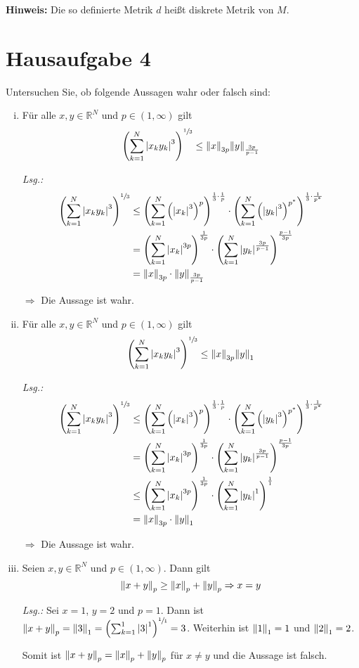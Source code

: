 \documentclass{article}
\begin{document}
\textbf{Hinweis:} Die so definierte Metrik $d$ heißt diskrete Metrik von $M$.

\newpage
\section*{Hausaufgabe 4}

Untersuchen Sie, ob folgende Aussagen wahr oder falsch sind:
\begin{enumerate}[(i)]
\item Für alle $x, y \in \mathbb{R}^N$ und $p \in (1, \infty)$ gilt
  \[
    \qty(\sum_{k = 1}^N \abs{x_k y_k}^3)^{\sfrac{1}{3}} \leq \norm{x}_{3p} \norm{y}_{\frac{3p}{p - 1}}
  \]

  \textit{Lsg.:}
  \begin{align*}
    \qty(\sum_{k = 1}^N \abs{x_k y_k}^3)^{\sfrac{1}{3}}
    &\leq \qty(\sum_{k = 1}^N \qty(\abs{x_k}^3)^p )^{\frac{1}{3} \cdot \frac{1}{p}} \cdot
      \qty(\sum_{k = 1}^N \qty(\abs{y_k}^3)^{p^*} )^{\frac{1}{3} \cdot \frac{1}{p^*}} \\
    &= \qty(\sum_{k = 1}^N \abs{x_k}^{3p})^{\frac{1}{3p}} \cdot
      \qty(\sum_{k = 1}^N \abs{y_k}^{\frac{3p}{p - 1}} )^{\frac{p - 1}{3p}} \\
    &= \norm{x}_{3p} \cdot \norm{y}_{\frac{3p}{p - 1}}
  \end{align*}

  $\Rightarrow$ Die Aussage ist wahr.

\item Für alle $x, y \in \mathbb{R}^N$ und $p \in (1, \infty)$ gilt
  \[
    \qty(\sum_{k = 1}^N \abs{x_k y_k}^3)^{\sfrac{1}{3}} \leq \norm{x}_{3p} \norm{y}_1
  \]

  \textit{Lsg.:}
 \begin{align*}
    \qty(\sum_{k = 1}^N \abs{x_k y_k}^3)^{\sfrac{1}{3}}
    &\leq \qty(\sum_{k = 1}^N \qty(\abs{x_k}^3)^p )^{\frac{1}{3} \cdot \frac{1}{p}} \cdot
      \qty(\sum_{k = 1}^N \qty(\abs{y_k}^3)^{p^*} )^{\frac{1}{3} \cdot \frac{1}{p^*}} \\
    &= \qty(\sum_{k = 1}^N \abs{x_k}^{3p})^{\frac{1}{3p}} \cdot
      \qty(\sum_{k = 1}^N \abs{y_k}^{\frac{3p}{p - 1}} )^{\frac{p - 1}{3p}} \\
    &\leq \qty(\sum_{k = 1}^N \abs{x_k}^{3p})^{\frac{1}{3p}} \cdot
      \qty(\sum_{k = 1}^N \abs{y_k}^1 )^{\frac{1}{1}} \\
    &= \norm{x}_{3p} \cdot \norm{y}_1
  \end{align*}

  $\Rightarrow$ Die Aussage ist wahr.
  
\item Seien $x, y \in \mathbb{R}^N$ und $p \in (1, \infty)$. Dann gilt
  \[
    \norm{x + y}_p \geq \norm{x}_p + \norm{y}_p \Rightarrow x = y
  \]

  \textit{Lsg.:} Sei $x = 1$, $y = 2$ und $p = 1$.
  Dann ist $\norm{x + y}_p = \norm{3}_1 = \qty(\sum_{k=1}^1\abs{3}^1)^{\sfrac{1}{1}} = 3$.
  Weiterhin ist $\norm{1}_1 = 1$ und $\norm{2}_1 = 2$.

  Somit ist $\norm{x + y}_p = \norm{x}_p + \norm{y}_p$ für $x \ne y$ und die
  Aussage ist falsch.
\end{enumerate}
\end{document}
